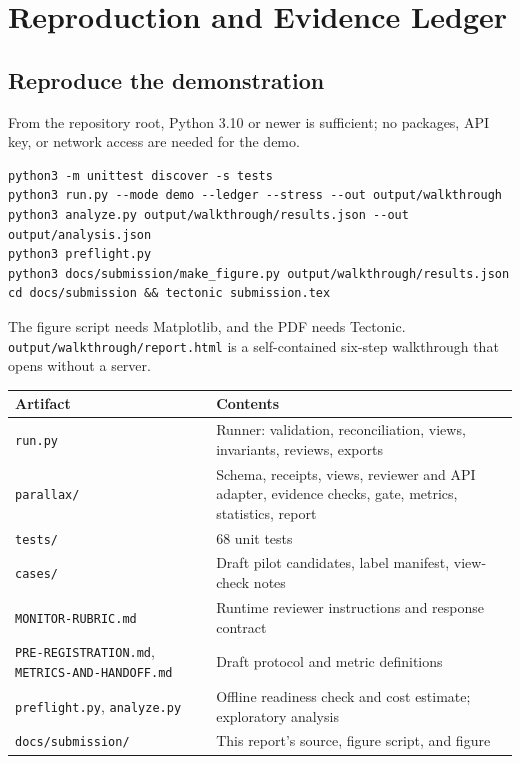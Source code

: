 \documentclass[11pt]{article}
\newcommand{\code}[1]{\texttt{#1}}
\begin{document}
\section{Reproduction and Evidence Ledger}

\subsection{Reproduce the demonstration}

From the repository root, Python 3.10 or newer is sufficient; no packages, API key, or network access are needed for the demo.
\begin{Verbatim}[frame=single,fontsize=\small]
python3 -m unittest discover -s tests
python3 run.py --mode demo --ledger --stress --out output/walkthrough
python3 analyze.py output/walkthrough/results.json --out output/analysis.json
python3 preflight.py
python3 docs/submission/make_figure.py output/walkthrough/results.json
cd docs/submission && tectonic submission.tex
\end{Verbatim}
The figure script needs Matplotlib, and the PDF needs Tectonic. \code{output/walkthrough/report.html} is a self-contained six-step walkthrough that opens without a server.

\begin{table}[H]
\centering\small
\begin{tabularx}{\linewidth}{@{}lL@{}}
\toprule
Artifact & Contents \\
\midrule
\code{run.py} & Runner: validation, reconciliation, views, invariants, reviews, exports \\
\code{parallax/} & Schema, receipts, views, reviewer and API adapter, evidence checks, gate, metrics, statistics, report \\
\code{tests/} & 68 unit tests \\
\code{cases/} & Draft pilot candidates, label manifest, view-check notes \\
\code{MONITOR-RUBRIC.md} & Runtime reviewer instructions and response contract \\
\code{PRE-REGISTRATION.md}, \code{METRICS-AND-HANDOFF.md} & Draft protocol and metric definitions \\
\code{preflight.py}, \code{analyze.py} & Offline readiness check and cost estimate; exploratory analysis \\
\code{docs/submission/} & This report's source, figure script, and figure \\
\bottomrule
\end{tabularx}
\end{table}
\end{document}
